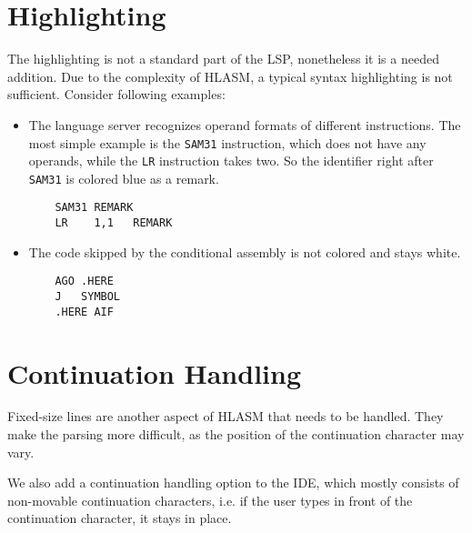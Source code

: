 \section{Highlighting}

The highlighting is not a standard part of the LSP, nonetheless it is a needed addition. Due to the complexity of HLASM, a typical syntax highlighting is not sufficient. Consider following examples:

\begin{itemize}
	\item The language server recognizes operand formats of different instructions. The most simple example is the \texttt{SAM31} instruction, which does not have any operands, while the \texttt{LR} instruction takes two. So the identifier right after \texttt{SAM31} is colored blue as a remark. 
	
	\begin{lstlisting}
	SAM31 REMARK
	LR    1,1   REMARK
	\end{lstlisting}
	
	\item The code skipped by the conditional assembly is not colored and stays white.
	\begin{lstlisting}
	AGO .HERE
	J   SYMBOL
	.HERE AIF
	\end{lstlisting}
	
\end{itemize}


\section{Continuation Handling}

Fixed-size lines are another aspect of HLASM that needs to be handled. They make the parsing more difficult, as the position of the continuation character may vary. 

We also add a continuation handling option to the IDE, which mostly consists of non-movable continuation characters, i.e. if the user types in front of the continuation character, it stays in place.


